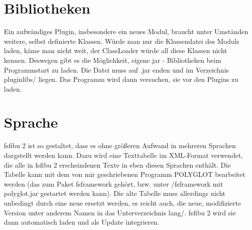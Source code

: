\documentclass[a4paper,10pt,halfparskip,oneside,smallheadings]{scrbook}
\begin{document}
\section{Bibliotheken}
Ein aufwändiges Plugin, insbesondere ein neues Modul, braucht unter Umständen weitere, selbst definierte Klassen. Würde man nur die Klassendatei des Moduls laden, käme man nicht weit, der ClassLoader würde all diese Klassen nicht kennen. Deswegen gibt es die Möglichkeit, eigene jar - Bibliotheken beim Programmstart zu laden. Die Datei muss auf .jar enden und im Verzeichnis pluginlibs/ liegen. Das Programm wird dann versuchen, sie vor den Plugins zu laden.

\section{Sprache}\label{language}
fsfibu 2 ist so gestaltet, dass es ohne größeren Aufwand in mehreren Sprachen dargstellt werden kann. Dazu wird eine Texttabelle im XML-Format verwendet, die alle in fsfibu 2 erscheindenen Texte in eben diesen Sprachen enthält. Die Tabelle kann mit dem von mir geschriebenen Programm POLYGLOT bearbeitet werden (das zum Paket fsframework gehört, bzw. unter /fsframework mit polyglot.jar gestartet werden kann). Die alte Tabelle muss allerdings nicht unbedingt durch eine neue ersetzt werden, es reicht auch, die neue, modifizierte Version unter anderem Namen in das Unterverzeichnis lang/. fsfibu 2 wird sie dann automatisch laden und als Update integrieren.
\end{document}
